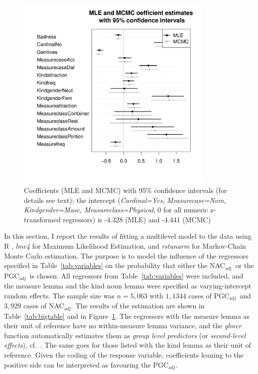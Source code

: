 \documentclass[USenglish]{article}
\newcommand{\Sub}[1]{\ensuremath{\mathrm{_{#1}}}}
\newcommand{\NACa}{NAC\Sub{adj}}
\newcommand{\PGCa}{PGC\Sub{adj}}
\begin{document}
\begin{figure}[hb!]
  \centering
  \includegraphics[width=0.85\textwidth]{../R/output/corpus_fixeffs_mle+mcmc}
  \caption{Coefficients (MLE and MCMC) with 95\% confidence intervals (for details see text); the intercept (\textit{Cardinal=Yes}, \textit{Measurecase=Nom}, \textit{Kindgender=Masc}, \textit{Measureclass=Physical}; 0 for all numeric z-transformed regressors) is -4.328 (MLE) and -4.441 (MCMC)}
  \label{fig:fixeffs}
\end{figure}

In this section, I report the results of fitting a multilevel model to the data using R \citep{R}, \textit{lme4} \citep{lme4} for Maximum Likelihood Estimation, and \textit{rstanarm} \citep{rstanarm} for Markov-Chain Monte Carlo estimation.
The purpose is to model the influence of the regressors specified in Table~\ref{tab:variables} on the probability that either the \NACa\ or the \PGCa\ is chosen.
All regressors from Table~\ref{tab:variables} were included, and the measure lemma and the kind noun lemma were specified as varying-intercept random effects.
The sample size was $n=5,063$ with $1,1344$ cases of \PGCa\ and $3,929$ cases of \NACa.
The results of the estimation are shown in Table~\ref{tab:bigtable} and in Figure~\ref{fig:fixeffs}.
The regressors with the measure lemma as their unit of reference have no within-measure lemma variance, and the \textit{glmer} function automatically estimates them as \textit{group level predictors} (or \textit{second-level effects}), cf.\ \cite[265--269,302--304]{GelmanHill2006}.
The same goes for those listed with the kind lemma as their unit of reference.
Given the coding of the response variable, coefficients leaning to the positive side can be interpreted as favouring the \PGCa.
\end{document}
